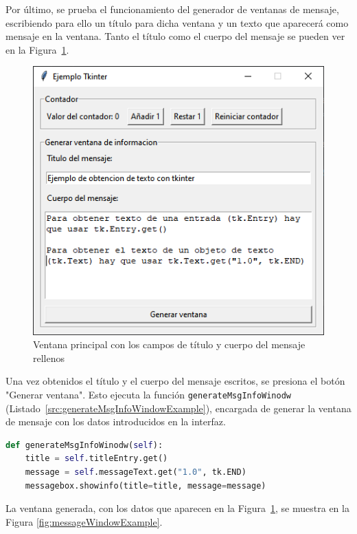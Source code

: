 Por último, se prueba el funcionamiento del generador de ventanas de mensaje, escribiendo para ello un título para dicha ventana y un texto que aparecerá como mensaje en la ventana. Tanto el título como el cuerpo del mensaje se pueden ver en la Figura~\ref{fig:messagePrincipalWindowExample}.

\begin{figure}[H]
    \centering
    \includegraphics[width=0.6\linewidth]{fig/Ejemplo Tkinter/ventana principal con mensaje escrito.png}
    \caption{Ventana principal con los campos de título y cuerpo del mensaje rellenos}
    \label{fig:messagePrincipalWindowExample}
\end{figure}

Una vez obtenidos el título y el cuerpo del mensaje escritos, se presiona el botón "Generar ventana". Esto ejecuta la función \texttt{generateMsgInfoWinodw} (Listado~\ref{src:generateMsgInfoWindowExample}), encargada de generar la ventana de mensaje con los datos introducidos en la interfaz.

\begin{lstlisting}[language=Python,
                   style=python,
                   frame=none,
                   numbers=none,
                   basicstyle=\ttfamily\normalsize,
                   caption={Función \texttt{generateMsgInfoWinodw} del ejemplo de Tkinter},
                   label=src:generateMsgInfoWindowExample,
                   inputencoding=utf8]                   
def generateMsgInfoWinodw(self):
    title = self.titleEntry.get()
    message = self.messageText.get("1.0", tk.END)
    messagebox.showinfo(title=title, message=message)
\end{lstlisting}

La ventana generada, con los datos que aparecen en la Figura~\ref{fig:messagePrincipalWindowExample}, se muestra en la Figura \ref{fig:messageWindowExample}. 

